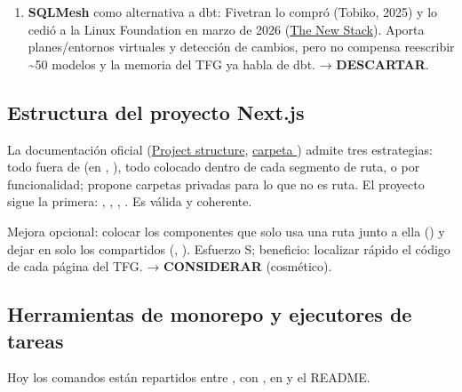 \begin{enumerate}
\item \textbf{SQLMesh} como alternativa a dbt: Fivetran lo compró (Tobiko, 2025) y lo cedió a la Linux Foundation en marzo de 2026 (\href{https://thenewstack.io/fivetran-donates-sqlmesh-lf/}{The New Stack}). Aporta planes/entornos virtuales y detección de cambios, pero no compensa reescribir \textasciitilde{}50 modelos y la memoria del TFG ya habla de dbt. → \textbf{DESCARTAR}.
\end{enumerate}

\subsection{Estructura del proyecto Next.js}

La documentación oficial (\href{https://nextjs.org/docs/app/getting-started/project-structure}{Project structure}, \href{https://nextjs.org/docs/app/api-reference/file-conventions/src-folder}{carpeta }) admite tres estrategias: todo fuera de  (en , ), todo colocado dentro de cada segmento de ruta, o por funcionalidad; propone carpetas privadas  para lo que no es ruta. El proyecto sigue la primera: , , , . Es válida y coherente.

Mejora opcional: colocar los componentes que solo usa una ruta junto a ella () y dejar en  solo los compartidos (, ). Esfuerzo S; beneficio: localizar rápido el código de cada página del TFG. → \textbf{CONSIDERAR} (cosmético).

\subsection{Herramientas de monorepo y ejecutores de tareas}

Hoy los comandos están repartidos entre ,  con ,  en  y el README.

